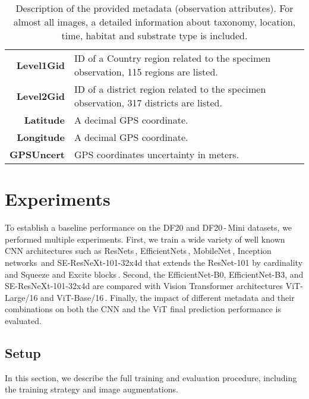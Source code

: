 \documentclass[10pt,twocolumn,letterpaper]{article}
\begin{document}
\begin{table}[b!]
\begin{center}
\begin{tabular}{| r  p{6.0cm}@{\hskip 5pt}  |}
\footnotesize{\textbf{Level1Gid}} & \footnotesize{ID of a Country region related to the specimen observation, 115 regions are listed.} \\
\footnotesize{\textbf{Level2Gid}} & \footnotesize{ID of a district region related to the specimen observation, 317 districts are listed.} \\
        \footnotesize{\textbf{Latitude}} & \footnotesize{A decimal GPS coordinate.} \\
        \footnotesize{\textbf{Longitude}} & \footnotesize{A decimal GPS coordinate.} \\
        \footnotesize{\textbf{GPSUncert}} & \footnotesize{GPS coordinates uncertainty in meters.} \\
\hline
\end{tabular}
\end{center}
\caption{Description of the provided metadata (observation attributes). For almost all images, a detailed information about taxonomy, location, time, habitat and substrate type is included.}
\label{table:metadata}
\end{table}

\pagebreak

\section{Experiments}
\label{experiments}

To establish a baseline performance on the DF20 and DF20\,-\,Mini datasets, we performed multiple experiments. First, we train a wide variety of well known CNN architectures such as ResNets\,\cite{resnets}, EfficientNets\,\cite{tan2019efficientnet}, MobileNet\,\cite{sandler2018mobilenetv2}, Inception networks\,\cite{inceptions} and \mbox{SE-ResNeXt-101-32x4d} that extends the ResNet-101 by cardinality\,\cite{next} and Squeeze and Excite blocks\,\cite{SE_Net}. Second, the EfficientNet-B0, EfficientNet-B3, and \mbox{SE-ResNeXt-101-32x4d} are compared with Vision Transformer architectures  ViT-Large/16 and ViT-Base/16\,\cite{vit}. Finally, the impact of different metadata and their combinations on both the CNN and the ViT final prediction performance is evaluated.


\subsection{Setup}
\label{setup}

In this section, we describe the full training and evaluation procedure, including the training strategy and image augmentations.
\end{document}
